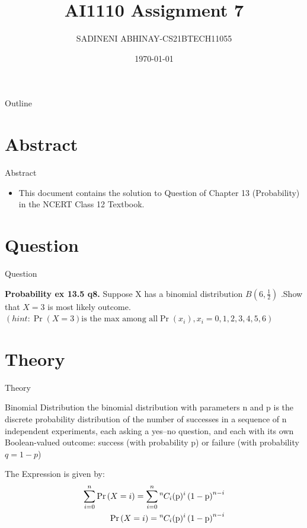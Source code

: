\documentclass{beamer}
\title{AI1110 Assignment 7}
\author{SADINENI ABHINAY-CS21BTECH11055}
\date{\today}
\providecommand{\pr}[1]{\ensuremath{\Pr\left(#1\right)}}
\providecommand{\brak}[1]{\ensuremath{\left(#1\right)}}
\newcommand*{\permcomb}[4][0mu]{{{}^{#3}\mkern#1#2_{#4}}}
\newcommand*{\comb}[1][-1mu]{\permcomb[#1]{C}}
\begin{document}
	
	\begin{frame}
		\titlepage
	\end{frame}

\begin{frame}{Outline}
  \tableofcontents
\end{frame}

\section{Abstract}
	\begin{frame}{Abstract}
		\begin{itemize}
			\item 	This document contains the solution to Question of Chapter 13 (Probability) in the NCERT Class 12 Textbook.
		\end{itemize}
	\end{frame}
	
	\section{Question}
	\begin{frame}{Question}
		\begin{block}{\textbf{Probability  ex 13.5 q8.}}
			 Suppose X has a binomial distribution $B\brak{6,\frac{1}{2}}$ .Show that $X=3$ is most likely outcome.
			 \brak{hint: \pr{X=3} \text{is the max among all} \pr{x_i}, x_{i}=0,1,2,3,4,5,6}
		\end{block}
	\end{frame}
	

	\section{Theory}
	\begin{frame}{Theory}
			 \begin{block}{Binomial Distribution}
	      the binomial distribution with parameters n and p is the discrete probability distribution of the number of successes in a sequence of n independent experiments, each asking a yes–no question, and each with its own Boolean-valued outcome: success (with probability p) or failure (with probability $q = 1 − p$)
		\end{block}	   
			      The Expression is given by:
\begin{align}
\sum_{i=0}^{n}\pr{X = i} =  \sum_{i=0}^{n} \comb{n}{i}(\text{p})^i\left(1-\text{p}\right)^{n-i}
\\
\pr{X = i} =\comb{n}{i}(\text{p})^i\left(1-\text{p}\right)^{n-i}
	      \end{align}
	\end{frame}
	
\end{document}
